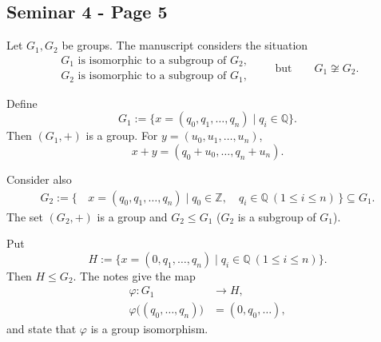 
\subsection*{Seminar 4 - Page 5}

\noindent Let $G_1,G_2$ be groups. The manuscript considers the situation
\[
\begin{gathered}
 G_1\text{ is isomorphic to a subgroup of }G_2,\\
 G_2\text{ is isomorphic to a subgroup of }G_1,
\end{gathered}
\qquad\text{but}\qquad G_1\not\cong G_2.
\]

\medskip
\noindent Define
\[
 G_1:=\bigl\{x=(q_0,q_1,\ldots,q_n)\mid q_i\in\mathbb Q\bigr\}.
\]
Then $(G_1,+)$ is a group. For
$y=(u_0,u_1,\ldots,u_n)$,
\[
 x+y=(q_0+u_0,\ldots,q_n+u_n).
\]

\noindent Consider also
\[
 \begin{aligned}
 G_2:=\bigl\{\,&x=(q_0,q_1,\ldots,q_n)\mid
     q_0\in\mathbb Z,\quad q_i\in\mathbb Q\ 
     (1\leq i\leq n)\,\bigr\}\subseteq G_1.
 \end{aligned}
\]
The set $(G_2,+)$ is a group and $G_2\leq G_1$
($G_2$ is a subgroup of $G_1$).

\medskip
\noindent Put
\[
 H:=\bigl\{x=(0,q_1,\ldots,q_n)\mid
     q_i\in\mathbb Q\ (1\leq i\leq n)\bigr\}.
\]
Then $H\leq G_2$. The notes give the map
\[
 \begin{aligned}
 \varphi:G_1&\longrightarrow H,\\
 \varphi\bigl((q_0,\ldots,q_n)\bigr)&=(0,q_0,\ldots),
 \end{aligned}
\]
and state that $\varphi$ is a group isomorphism.

